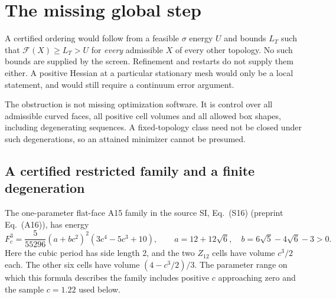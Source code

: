 \documentclass[11pt,a4paper]{report}
\newcommand{\DF}{\mathcal F}
\begin{document}
\section{The missing global step}

A certified ordering would follow from a feasible $\sigma$ energy $U$ and
bounds $L_T$ such that $\DF(X)\geq L_T>U$ for \emph{every} admissible
$X$ of every other topology. No such bounds are supplied by the screen.
Refinement and restarts do not supply them either. A positive Hessian at a
particular stationary mesh would only be a local statement, and would
still require a continuum error argument.

The obstruction is not missing optimization software. It is control over
all admissible curved faces, all positive cell volumes and all allowed
box shapes, including degenerating sequences. A fixed-topology class need
not be closed under such degenerations, so an attained minimizer cannot
be presumed.

\subsection{A certified restricted family and a finite degeneration}

The one-parameter flat-face A15 family in the source SI, Eq.~(S16)
(preprint Eq.~(A16)), has energy
\[
 F_c^3=\frac5{55296}(a+bc^2)^2(3c^4-5c^3+10),\qquad
 a=12+12\sqrt6,\quad b=6\sqrt5-4\sqrt6-3>0.
\]
Here the cubic period has side length 2, and the two $Z_{12}$ cells have
volume $c^3/2$ each. The other six cells have volume $(4-c^3/2)/3$.
The parameter range on which this formula describes the family includes
positive $c$ approaching zero and the sample $c=1.22$ used below.
\end{document}
